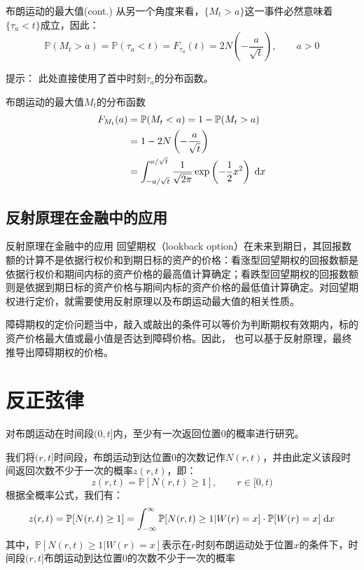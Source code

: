 \documentclass[t]{beamer}
\newcommand{\dif}{{\;\rm d}}
\renewcommand{\Pr}{\mathbb{P}}
\begin{document}
\begin{frame}{布朗运动的最大值(cont.)}
    从另一个角度来看，$\{M_t>a\}$这一事件必然意味着$\{\tau_a<t\}$成立，因此：
    \begin{equation*}
    \Pr(M_t>a)=\Pr(\tau_a<t)=F_{\tau_a}(t)=2N\left( -\frac{a}{\sqrt{t}}\right) ,\qquad a>0
    \end{equation*}

    \begin{block}{提示：}
      此处直接使用了首中时刻$\tau_a$的分布函数。
    \end{block}
\end{frame}



\begin{frame}{布朗运动的最大值$M_t$的分布函数}
    \[\begin{split}
      F_{M_t}(a)&=\Pr(M_t<a)=1-\Pr(M_t>a)\\
      &=1-2N\left( -\frac{a}{\sqrt{t}}\right)\\
      &=\int^{a/\sqrt{t}}_{-a/\sqrt{t}}\frac{1}{\sqrt{2\pi}}\exp\left(-\frac{1}{2}x^2\right)\dif x
      \end{split}\]
\end{frame}

\subsection{反射原理在金融中的应用}
\begin{frame}{反射原理在金融中的应用}
  回望期权（lookback option）在未来到期日，其回报数额的计算不是依据行权价和到期日标的资产的价格：看涨型回望期权的回报数额是依据行权价和期间内标的资产价格的最高值计算确定；看跌型回望期权的回报数额则是依据到期日标的资产价格与期间内标的资产价格的最低值计算确定。对回望期权进行定价，就需要使用反射原理以及布朗运动最大值的相关性质。

  障碍期权的定价问题当中，敲入或敲出的条件可以等价为判断期权有效期内，标的资产价格最大值或最小值是否达到障碍价格。因此，
也可以基于反射原理，最终推导出障碍期权的价格。
\end{frame}

\section{反正弦律}
\begin{frame}{}
  对布朗运动在时间段$(0,t]$内，至少有一次返回位置0的概率进行研究。

我们将$(r,t]$时间段，布朗运动到达位置0的次数记作$N(r,t)$，并由此定义该段时间返回次数不少于一次的概率$z(r,t)$，即：
\begin{equation*}
z(r,t)=\Pr[N(r,t)\ge 1],\qquad r\in[0,t)
\end{equation*}
根据全概率公式，我们有：
\begin{equation*}
z(r,t)=\Pr[N(r,t)\ge 1]=\int_{-\infty}^{\infty}\Pr[N(r,t)\ge 1|W(r)=x]\cdot \Pr[W(r)=x]\dif x
\end{equation*}
其中，$\Pr[N(r,t)\ge 1|W(r)=x]$表示在$r$时刻布朗运动处于位置$x$的条件下，时间段$(r,t]$布朗运动到达位置0的次数不少于一次的概率


\end{frame}
\end{document}
